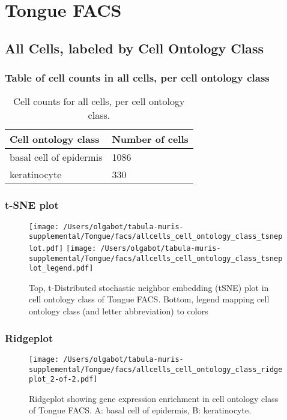 \newpage
\section{Tongue FACS}

\subsection{All Cells, labeled by Cell Ontology Class}
\subsubsection{Table of cell counts in all cells, per cell ontology class}\begin{table}[h]
\centering
\label{my-label}
\begin{tabular}{@{}ll@{}}
\toprule

Cell ontology class& Number of cells \\ \midrule
basal cell of epidermis & 1086 \\

keratinocyte & 330 \\
\bottomrule
\end{tabular}
\caption{Cell counts for all cells, per cell ontology class.}
\end{table}

\newpage
\subsubsection{t-SNE plot}
\begin{figure}[h]
\centering
\texttt{[image: /Users/olgabot/tabula-muris-supplemental/Tongue/facs/allcells\_cell\_ontology\_class\_tsneplot.pdf]}
\texttt{[image: /Users/olgabot/tabula-muris-supplemental/Tongue/facs/allcells\_cell\_ontology\_class\_tsneplot\_legend.pdf]}
\caption{Top, t-Distributed stochastic neighbor embedding (tSNE) plot  in cell ontology class of Tongue FACS. Bottom, legend mapping cell ontology class (and letter abbreviation) to colors}
\end{figure}


\newpage
\newpage
\subsubsection{Ridgeplot}
\begin{figure}[h]
\centering
\texttt{[image: /Users/olgabot/tabula-muris-supplemental/Tongue/facs/allcells\_cell\_ontology\_class\_ridgeplot\_2-of-2.pdf]}

\caption{ Ridgeplot  showing gene expression enrichment in cell ontology class of Tongue FACS. A: basal cell of epidermis, B: keratinocyte.}
\end{figure}


